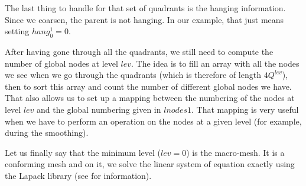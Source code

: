 The last thing to handle for that set of quadrants is the hanging information. Since we coarsen, the parent is not hanging. In our example, that just means setting $hang^1_0 = 0$. 

After having gone through all the quadrants, we still need to compute the number of global nodes at level $lev$. The idea is to fill an array with all the nodes we see when we go through the quadrants (which is therefore of length $4Q^{lev}$), then to sort this array and count the number of different global nodes we have. That also allows us to set up a mapping between the numbering of the nodes at level $lev$ and the global numbering given in $lnodes1$. That mapping is very useful when we have to perform an operation on the nodes at a given level (for example, during the smoothing). 
 
Let us finally say that the minimum level ($lev = 0$) is the macro-mesh. It is a conforming mesh and on it, we solve the linear system of equation exactly using the Lapack library (see \cite{lapack} for information).  
 












